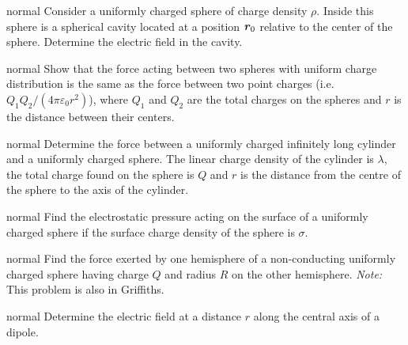 \hypertarget{P76}{}
\begin{solution}{normal} %
Consider a uniformly charged sphere of charge density $\rho$. Inside this sphere is a spherical cavity located at a position $\textbf{\textit{r}}_0$ relative to the center of the sphere. Determine the electric field in the cavity.
\end{solution}

\hypertarget{P77}{}
\begin{solution}{normal} %
Show that the force acting between two spheres with uniform charge distribution is the same as the force between two point charges (i.e. $Q_1Q_2/(4\pi\varepsilon_0r^2)$), where $Q_1$ and $Q_2$ are the total charges on the spheres and $r$ is the distance between their centers.
\end{solution}

\hypertarget{P78}{}
\begin{solution}{normal} %
Determine the force between a uniformly charged infinitely long cylinder and a uniformly charged sphere. The linear charge density of the cylinder is $\lambda$, the total charge found on the sphere is $Q$ and $r$ is the distance from the centre of the sphere to the axis of the cylinder.
\end{solution}

\hypertarget{P79}{}
\begin{solution}{normal} %
Find the electrostatic pressure acting on the surface of a uniformly charged sphere if the surface charge density of the sphere is $\sigma$.
\end{solution}

\hypertarget{P80}{}
\begin{solution}{normal} %
Find the force exerted by one hemisphere of a non-conducting uniformly charged sphere having charge $Q$ and radius $R$ on the other hemisphere. \textit{Note:} This problem is also in Griffiths.
\end{solution}

\hypertarget{P81}{}
\begin{solution}{normal} %
Determine the electric field at a distance $r$ along the central axis of a dipole.
\end{solution}

